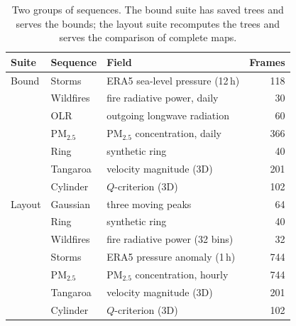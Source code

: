 \begin{table}[t]
\centering
\caption{Two groups of sequences. The bound suite has saved trees and serves the bounds; the layout suite recomputes the trees and serves the comparison of complete maps.}
\label{tab:data}
\footnotesize
\setlength{\tabcolsep}{2pt}
\renewcommand{\arraystretch}{0.95}
\begin{tabular*}{\columnwidth}{@{\extracolsep{\fill}}lllr@{}}
\toprule
Suite & Sequence & Field & Frames \\
\midrule
Bound & Storms~\cite{Hersbach:2020:ERA5} & ERA5 sea-level pressure (12\,h) & 118 \\
 & Wildfires~\cite{Franke:2021:1DP} & fire radiative power, daily & 30 \\
 & OLR~\cite{NOAA:OLR} & outgoing longwave radiation & 60 \\
 & PM$_{2.5}$~\cite{Dong:2026:PM25} & PM$_{2.5}$ concentration, daily & 366 \\
 & Ring & synthetic ring & 40 \\
 & Tangaroa~\cite{Popinet:2004:Tangaroa} & velocity magnitude (3D) & 201 \\
 & Cylinder~\cite{Camarri:2005:Cylinder} & $Q$-criterion (3D) & 102 \\
\midrule
Layout & Gaussian & three moving peaks & 64 \\
 & Ring & synthetic ring & 40 \\
 & Wildfires & fire radiative power (32 bins) & 32 \\
 & Storms & ERA5 pressure anomaly (1\,h) & 744 \\
 & PM$_{2.5}$~\cite{Kong:2021:CAQRA} & PM$_{2.5}$ concentration, hourly & 744 \\
 & Tangaroa & velocity magnitude (3D) & 201 \\
 & Cylinder & $Q$-criterion (3D) & 102 \\
\bottomrule
\end{tabular*}
\end{table}
